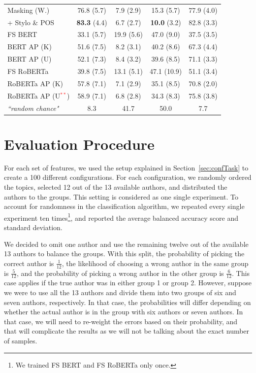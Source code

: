 \documentclass[11pt]{article}
\begin{document}
\begin{table}[!htb]
\begin{tabular}{l|ccc|||c}
Masking (W.)                & 76.8 (5.7)  & \phantom{0}7.9 (2.9)  & 15.3 (5.7)  & 77.9 (4.0) \\
\phantom{hi}+ Stylo \& POS  & \textbf{83.3} (4.4)  & \phantom{0}6.7 (2.7)  & \textbf{10.0} (3.2)  & 82.8 (3.3) \\ \hline \hline

FS BERT                     & 33.1 (5.7)  & 19.9 (5.6)  & 47.0 (9.0)  & 37.5 (3.5)\\
BERT AP (K)                 & 51.6 (7.5)  & \phantom{0}8.2 (3.1)  & 40.2 (8.6)  & 67.3 (4.4)\\
BERT AP (U)                 & 52.1 (7.3)  & \phantom{0}8.4 (3.2)  & 39.6 (8.5)  & 71.1 (3.3)\\ \hline

FS RoBERTa                  & 39.8 (7.5)  & 13.1 (5.1)  & 47.1 (10.9) &  51.1 (3.4)\\
RoBERTa AP (K)              & 57.8 (7.1)  & \phantom{0}7.1 (2.9)  & 35.1 (8.5)  &  70.8 (2.0)\\
RoBERTa AP (U\textcolor{red}{$^{**}$})              & 58.9 (7.1)  & \phantom{0}6.8 (2.8)  & 34.3 (8.3)  &  75.8 (3.8)\\

\hline\hline
 \multirow{1}{*}{\textit{``random chance"}} & 8.3 & 41.7 & 50.0 & 7.7\\\hline
\end{tabular}

\end{table}

\section{\label{subsec:eval}Evaluation Procedure}
For each set of features, we used the setup explained in Section~\ref{sec:confTask} to create a 100 different configurations. For each configuration, we randomly ordered the topics, selected 12 out of the 13 available authors, and distributed the authors to the groups. This setting is considered as one single experiment. To account for randomness in the classification algorithm, we repeated every single experiment ten times\footnote{We trained FS BERT and FS RoBERTa only once.}, and reported the average balanced accuracy score and standard deviation.

We decided to omit one author and use the remaining twelve out of the available 13 authors to balance the groups. With this split, the probability of picking the correct author is $\frac{1}{12}$, the likelihood of choosing a wrong author in the same group is $\frac{5}{12}$, and the probability of picking a wrong author in the other group is $\frac{6}{12}$. This case applies if the true author was in either group 1 or group 2. However, suppose we were to use all the 13 authors and divide them into two groups of six and seven authors, respectively. In that case, the probabilities will differ depending on whether the actual author is in the group with six authors or seven authors. In that case, we will need to re-weight the errors based on their probability, and that will complicate the results as we will not be talking about the exact number of samples.  
\end{document}

